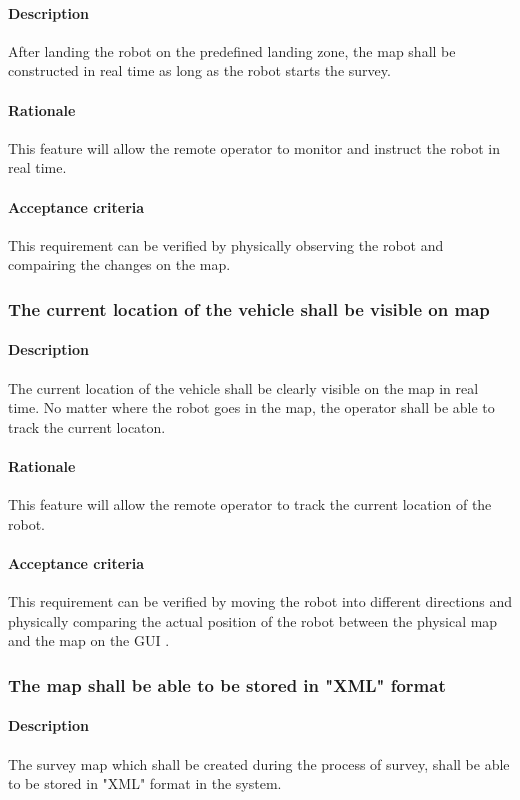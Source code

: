 \documentclass[10pt,a4paper,titlepage]{article}
\begin{document}
     \paragraph{Description}   After landing the robot on the predefined landing zone, the map shall be constructed in real time as long as the robot starts the survey.
    \paragraph{Rationale}   This feature will allow the remote operator to monitor and instruct the robot in real time.
    \paragraph{Acceptance criteria}   This requirement can be verified by physically observing the robot and compairing the changes on the map.
    \subsubsection{The current location of the vehicle shall be visible on map}
     \paragraph{Description}   The current location of the vehicle shall be clearly visible on the map in real time. No matter where the robot goes in the map, the operator shall be able to track the current locaton.
    \paragraph{Rationale}   This feature will allow the remote operator to track the current location of the robot. 
    \paragraph{Acceptance criteria}   This requirement can be verified by moving the robot into different directions and physically comparing the actual position of the robot between the physical map and the map on the GUI .
    \subsubsection{The map shall be able to be stored in "XML" format}
     \paragraph{Description}   The survey map which shall be created during the process of survey, shall be able to be stored in "XML" format in the system.
\end{document}
